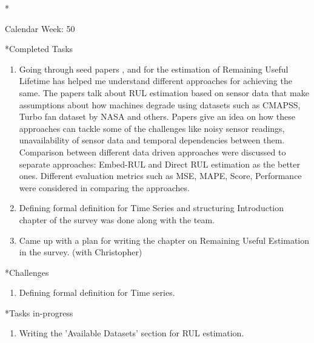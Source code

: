 \documentclass[11pt,a4paper]{article}
\begin{document}
\newpage
\begin{section}*{Calendar Week: 50 \hfill \date{11 December, 2020}}
 \begin{refsection}
     \begin{subsection}*{Completed Tasks}
         \begin{enumerate}
             \item
                   Going through seed papers \cite{DBLP:journals/corr/abs-1709-01073}, \cite{8326010} and \cite{DBLP:journals/tie/KhelifCMLFZ17} for the estimation of Remaining Useful Lifetime has helped me understand different approaches for achieving the same. The papers talk about RUL estimation based on sensor data that make assumptions about how machines degrade using datasets such as CMAPSS, Turbo fan dataset by NASA and others. Papers give an idea on how these approaches can tackle some of the challenges like noisy sensor readings, unavailability of sensor data and temporal dependencies between them. Comparison between different data driven approaches were discussed to separate approaches: Embed-RUL and Direct RUL estimation as the better ones. Different evaluation metrics such as MSE, MAPE, Score, Performance were considered in comparing the approaches.
             \item
                   Defining formal definition for Time Series and structuring Introduction chapter of the survey was done along with the team.
             \item
                   Came up with a plan for writing the chapter on Remaining Useful Estimation in the survey. (with Christopher)
         \end{enumerate}
     \end{subsection}
     \begin{subsection}*{Challenges}
         \begin{enumerate}
             \item
                   Defining formal definition for Time series.
         \end{enumerate}
     \end{subsection}

     \begin{subsection}*{Tasks in-progress}
         \begin{enumerate}
             \item
                   Writing the 'Available Datasets' section for RUL estimation.
         \end{enumerate}
     \end{subsection}

     \printbibliography
 \end{refsection}
\end{section}
\end{document}
